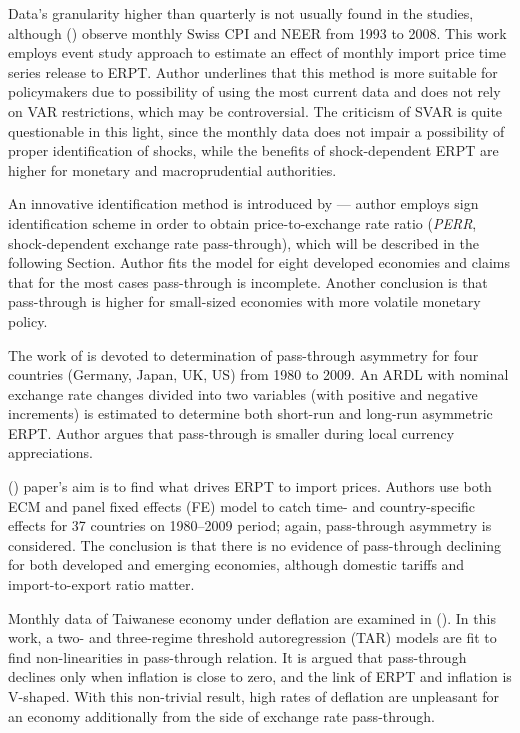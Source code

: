 \documentclass[12pt, a4paper]{extarticle}
\begin{document}
Data's granularity higher than quarterly is not usually found in the studies, although (\cite{Amstad2010}) observe monthly Swiss CPI and NEER from 1993 to 2008. This work employs event study approach to estimate an effect of monthly import price time series release to ERPT. Author underlines that this method is more suitable for policymakers due to possibility of using the most current data and does not rely on VAR restrictions, which may be controversial. The criticism of SVAR is quite questionable in this light, since the monthly data does not impair a possibility of proper identification of shocks, while the benefits of shock-dependent ERPT are higher for monetary and macroprudential authorities.

An innovative identification method is introduced by \textcite{An2012} --- author employs sign identification scheme in order to obtain price-to-exchange rate ratio (\textit{PERR}, shock-dependent exchange rate pass-through), which will be described in the following Section. Author fits the model for eight developed economies and claims that for the most cases pass-through is incomplete. Another conclusion is that pass-through is higher for small-sized economies with more volatile monetary policy.

The work of \textcite{Delatte2012} is devoted to determination of pass-through asymmetry for four countries (Germany, Japan, UK, US) from 1980 to 2009. An ARDL with nominal exchange rate changes divided into two variables (with positive and negative increments) is estimated to determine both short-run and long-run asymmetric ERPT. Author argues that pass-through is smaller during local currency appreciations.

(\cite{BrunAguerre2012}) paper's aim is to find what drives ERPT to import prices. Authors use both ECM and panel fixed effects (FE) model to catch time- and country-specific effects for 37 countries on 1980--2009 period; again, pass-through asymmetry is considered. The conclusion is that there is no evidence of pass-through declining for both developed and emerging economies, although domestic tariffs and import-to-export ratio matter.

Monthly data of Taiwanese economy under deflation are examined in (\cite{Lin2012}). In this work, a two- and three-regime threshold autoregression (TAR) models are fit to find non-linearities in pass-through relation. It is argued that pass-through declines only when inflation is close to zero, and the link of ERPT and inflation is V-shaped. With this non-trivial result, high rates of deflation are unpleasant for an economy additionally from the side of exchange rate pass-through.
\end{document}
